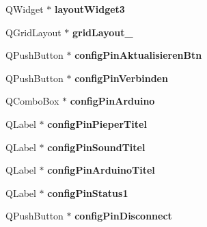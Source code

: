 \begin{DoxyCompactItemize}
\item 
Q\+Widget $\ast$ {\bfseries layout\+Widget3}\hypertarget{class_ui__klatschui_a46da9cee6d15eba41074ece7574dc2a6}{}\label{class_ui__klatschui_a46da9cee6d15eba41074ece7574dc2a6}

\item 
Q\+Grid\+Layout $\ast$ {\bfseries grid\+Layout\+\_}\hypertarget{class_ui__klatschui_ae134bfd8ef4f76b3d0ed05eb60b1781c}{}\label{class_ui__klatschui_ae134bfd8ef4f76b3d0ed05eb60b1781c}

\item 
Q\+Push\+Button $\ast$ {\bfseries config\+Pin\+Aktualisieren\+Btn}\hypertarget{class_ui__klatschui_aa9a13e66e1ca1a089e60eabad02c3fff}{}\label{class_ui__klatschui_aa9a13e66e1ca1a089e60eabad02c3fff}

\item 
Q\+Push\+Button $\ast$ {\bfseries config\+Pin\+Verbinden}\hypertarget{class_ui__klatschui_a4d9dbbee72d07276d53991e22033432a}{}\label{class_ui__klatschui_a4d9dbbee72d07276d53991e22033432a}

\item 
Q\+Combo\+Box $\ast$ {\bfseries config\+Pin\+Arduino}\hypertarget{class_ui__klatschui_a8112b1a8603edba43b24b9b6cc1d078a}{}\label{class_ui__klatschui_a8112b1a8603edba43b24b9b6cc1d078a}

\item 
Q\+Label $\ast$ {\bfseries config\+Pin\+Pieper\+Titel}\hypertarget{class_ui__klatschui_a2616baeea662604b796bf94f290f61bf}{}\label{class_ui__klatschui_a2616baeea662604b796bf94f290f61bf}

\item 
Q\+Label $\ast$ {\bfseries config\+Pin\+Sound\+Titel}\hypertarget{class_ui__klatschui_a0c3d8c3d93717f70cfd1c8553a869d7f}{}\label{class_ui__klatschui_a0c3d8c3d93717f70cfd1c8553a869d7f}

\item 
Q\+Label $\ast$ {\bfseries config\+Pin\+Arduino\+Titel}\hypertarget{class_ui__klatschui_a2bc46844c5bf012b51a1b52394be63b3}{}\label{class_ui__klatschui_a2bc46844c5bf012b51a1b52394be63b3}

\item 
Q\+Label $\ast$ {\bfseries config\+Pin\+Status1}\hypertarget{class_ui__klatschui_ac013ac83084b7fb71cb51afe1695b4b6}{}\label{class_ui__klatschui_ac013ac83084b7fb71cb51afe1695b4b6}

\item 
Q\+Push\+Button $\ast$ {\bfseries config\+Pin\+Disconnect}\hypertarget{class_ui__klatschui_a14c03eb9fac36e621f884ccbd108c68f}{}\label{class_ui__klatschui_a14c03eb9fac36e621f884ccbd108c68f}


\end{DoxyCompactItemize}
